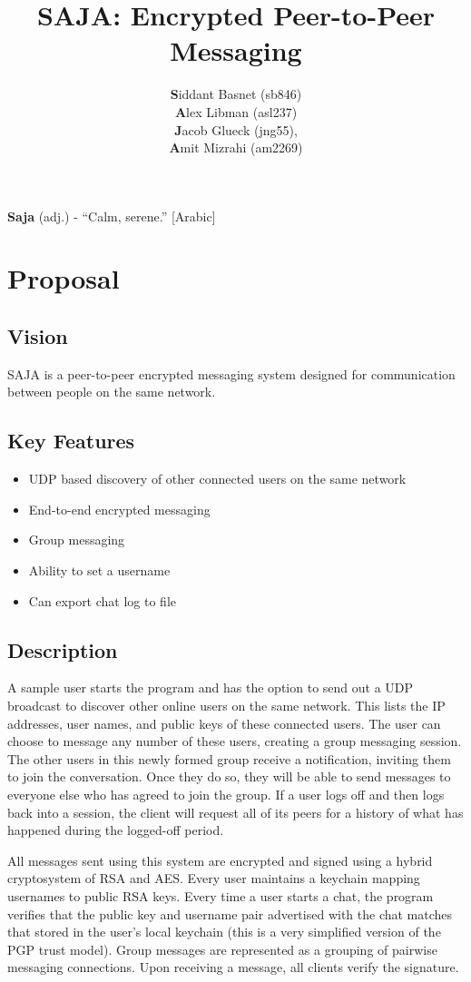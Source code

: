 \documentclass{scrartcl}
\title{SAJA: Encrypted Peer-to-Peer Messaging}
\author{\textbf{S}iddant Basnet (sb846) \\ \textbf{A}lex Libman (asl237)\\ \textbf{J}acob Glueck (jng55), \\ \textbf{A}mit Mizrahi (am2269)}
\date{}
\begin{document}
\maketitle

\textbf{Saja} (adj.) - ``Calm, serene.'' [Arabic]

\section{Proposal}
\subsection{Vision}
SAJA is a peer-to-peer encrypted messaging system designed for communication between people on the same network.

\subsection{Key Features}
\begin{itemize}
	\item UDP based discovery of other connected users on the same network
	\item End-to-end encrypted messaging
	\item Group messaging
	\item Ability to set a username
	\item Can export chat log to file
\end{itemize}

\subsection{Description}
A sample user starts the program and has the option to send out a UDP broadcast to discover other online users on the same network. This lists the IP addresses, user names, and public keys of these connected users. The user can choose to message any number of these users, creating a group messaging session. The other users in this newly formed group receive a notification, inviting them to join the conversation. Once they do so, they will be able to send messages to everyone else who has agreed to join the group. If a user logs off and then logs back into a session, the client will request all of its peers for a history of what has happened during the logged-off period.

All messages sent using this system are encrypted and signed using a hybrid cryptosystem of RSA and AES. Every user maintains a keychain mapping usernames to public RSA keys. Every time a user starts a chat, the program verifies that the public key and username pair advertised with the chat matches that stored in the user's local keychain (this is a very simplified version of the PGP trust model). Group messages are represented as a grouping of pairwise messaging connections. Upon receiving a message, all clients verify the signature.
\end{document}
